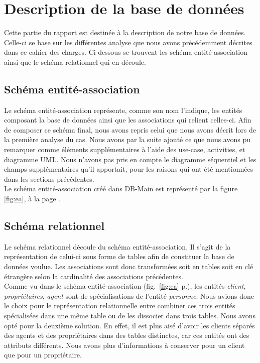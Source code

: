 \section{Description de la base de données}
Cette partie du rapport est destinée à la description de notre base de données. Celle-ci se base sur les différentes analyse que nous avons précédemment décrites dans ce cahier des charges. Ci-dessous se trouvent les schéma entité-association ainsi que le schéma relationnel qui en découle.

\subsection{Schéma entité-association}
Le schéma entité-association représente, comme son nom l'indique, les entités composant la base de données ainsi que les associations qui relient celles-ci. Afin de composer ce schéma final, nous avons repris celui que nous avons décrit lors de la première analyse du cas. Nous avons par la suite ajouté ce que nous avons pu remarquer comme éléments supplémentaires à l'aide des use-case, activities, et diagramme UML. Nous n'avons pas pris en compte le diagramme séquentiel et les champs supplémentaires qu'il apportait, pour les raisons qui ont été mentionnées dans les sections précédentes.\\

Le schéma entité-association créé dans DB-Main est représenté par la figure \ref{fig:ea}, à la page \pageref{fig:ea}.

\subsection{Schéma relationnel}
Le schéma relationnel découle du schéma entité-association. Il s'agit de la représentation de celui-ci sous forme de tables afin de constituer la base de données voulue. Les associations sont donc transformées soit en tables soit en clé étrangère selon la cardinalité des associations précédentes.\\

Comme vu dans le schéma entité-association (fig.~\ref{fig:ea} p.\pageref{fig:ea}), les entités \textit{client}, \textit{propriétaires}, \textit{agent} sont de spécialisations de l'entité \textit{personne}. Nous avions donc le choix pour le représentation relationnelle entre combiner ces trois entités spécialisées dans une même table ou de les dissocier dans trois tables. Nous avons opté pour la deuxième solution. En effet, il est plus aisé d'avoir les clients séparés des agents et des propriétaires dans des tables distinctes, car ces entités ont des attributs différents. Nous avons plus d'informations à conserver pour un client que pour un propriétaire.\\


